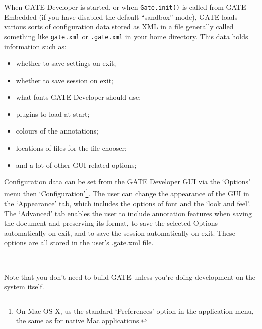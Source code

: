 When GATE Developer is started, or when {\tt Gate.init()} is called from GATE
Embedded (if you have disabled the default ``sandbox'' mode), GATE loads
various sorts of configuration data stored as XML in a file
generally called something like {\tt gate.xml} or {\tt .gate.xml} in your home
directory. This data holds information such as:
\begin{itemize}
  
\item whether to save settings on exit;

\item whether to save session on exit;

\item what fonts GATE Developer should use;

\item plugins to load at start;

\item colours of the annotations;

\item locations of files for the file chooser;

\item and a lot of other GUI related options;


\end{itemize}

Configuration data can be set from the GATE Developer GUI via the
`Options' menu then `Configuration'\footnote{On Mac OS X, us the standard
`Preferences' option in the application menu, the same as for native Mac
applications.}. The user can change the appearance of the GUI in the
`Appearance' tab, which includes the options of font and the `look and feel'.
The `Advanced' tab enables the user to include annotation features when saving
the document and preserving its format, to save the selected Options
automatically on exit, and to save the session automatically on exit. These
options are all stored in the user's .gate.xml file.



\mbox{ }

Note that you don't need to build GATE unless you're doing development
on the system itself.


